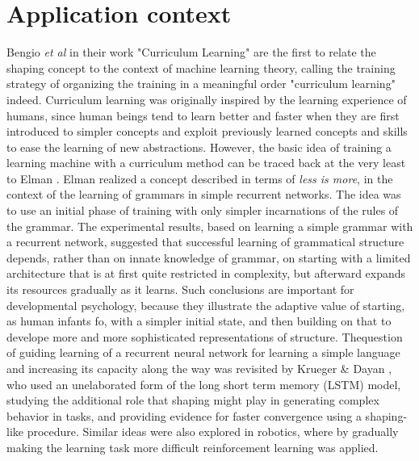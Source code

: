 \section{Application context}
Bengio \textit{et al} \cite{bengio2009curriculum} in their work "Curriculum Learning" are the first to relate the shaping concept
to the context of machine learning theory, calling the training strategy of organizing the training in a meaningful order "curriculum learning" indeed.
Curriculum learning was originally inspired by the learning experience of humans, since human beings tend to learn better and faster when 
they are first introduced to simpler concepts and exploit previously learned concepts and skills to ease the learning of new abstractions.
However, the basic idea of training a learning machine with a curriculum method can be traced back
at the very least to Elman \cite{Elman1}. Elman realized a concept described in terms of \textit{less is more}, in the context of the learning 
of grammars in simple recurrent networks. The idea was to use an initial phase of training with only simpler incarnations of the rules of the grammar.
The experimental results, based on learning a simple grammar with a recurrent network, suggested that
successful learning of grammatical structure depends, rather than on innate knowledge of grammar,
on starting with a limited architecture that is at first quite restricted in complexity, but afterward expands its resources
gradually as it learns. Such conclusions are important for developmental psychology, because they 
illustrate the adaptive value of starting, as human infants fo, with a simpler initial state, and then building on that to develope
more and more sophisticated representations of structure. Thequestion of guiding learning of a recurrent neural network for learning
a simple language and increasing its capacity along the way was revisited by Krueger \& Dayan \cite{krueger2009},
who used an unelaborated form of the 
long short term memory (LSTM) model, studying
the additional role that shaping might play in generating complex behavior in tasks, and providing
evidence for faster convergence using a shaping-like procedure. Similar ideas were also explored
in robotics, where by gradually making the learning task more difficult reinforcement learning was applied.

